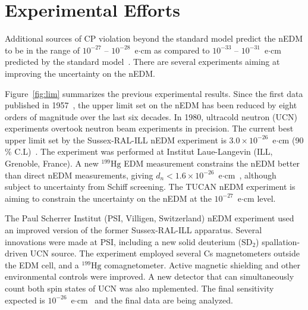 \section{Experimental Efforts}\label{sec:lim}

Additional sources of CP violation beyond the standard model predict the nEDM to be in the range of $10^{-27}$ -- $10^{-28}$~e$\cdot$cm as compared to $10^{-33}$ -- $10^{-31}$~e$\cdot$cm predicted by the standard model~\cite{theory_lim_1, theory_lim_2, theory_lim_3}. There are several experiments aiming at improving the uncertainty on the nEDM. 


Figure~\ref{fig:lim} summarizes the previous experimental results. Since the first data published in 1957~\cite{1_lim}, the upper limit set on the nEDM has been reduced by eight orders of magnitude over the last six decades. In 1980, ultracold neutron (UCN) experiments overtook neutron beam experiments in precision. The current best upper limit set by the Sussex-RAL-ILL nEDM experiment is $3.0 \times 10^{-26}$~e$\cdot$cm (90 \% C.L)~\cite{bestLim_1,bestLim_2}. The experiment was performed at Institut Laue-Langevin (ILL, Grenoble, France). A new $^{199}\mathrm{Hg}$ EDM measurement constrains the nEDM better than direct nEDM measurements, giving $d_n<\mathrm{1.6\times10^{-26}}$~e$\cdot$cm~\cite{schiff_screen}, although subject to uncertainty from Schiff screening. The TUCAN nEDM experiment is aiming to constrain the uncertainty on the nEDM at the $10^{-27}$~e$\cdot$cm level. 



The Paul Scherrer Institut (PSI, Villigen, Switzerland) nEDM experiment used an improved version of the former Sussex-RAL-ILL apparatus. Several innovations were made at PSI, including a new solid deuterium ($\mathrm{SD_2}$) spallation-driven UCN source. The experiment employed several Cs magnetometers outside the EDM cell, and a $^{199}\mathrm{Hg}$ comagnetometer. Active magnetic shielding and other environmental controls were improved. A new detector that can simultaneously count both spin states of UCN was also mplemented. The final sensitivity expected is $\mathrm{10^{-26}}$~e$\cdot$cm~\cite{psi} and the final data are being analyzed. 

